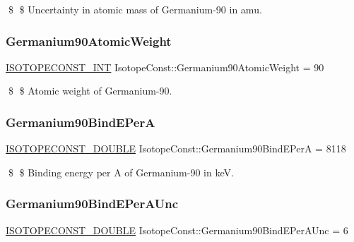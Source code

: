 \$ \$ Uncertainty in atomic mass of Germanium-\/90 in amu. \mbox{\label{group___isotope_const-_germanium-_ge90_ga7f4f88f50578589ab4432419ccce3417}} 
\subsubsection{\texorpdfstring{Germanium90\+Atomic\+Weight}{Germanium90AtomicWeight}}
{\footnotesize\ttfamily \mbox{\hyperlink{group___isotope_const-_macros_ga5f18360b3e99483a35c32d789e62621c}{I\+S\+O\+T\+O\+P\+E\+C\+O\+N\+S\+T\+\_\+\+I\+NT}} Isotope\+Const\+::\+Germanium90\+Atomic\+Weight = 90}

\$ \$ Atomic weight of Germanium-\/90. \mbox{\label{group___isotope_const-_germanium-_ge90_gac9ab75f606b60c91de4aa324fabcc825}} 
\subsubsection{\texorpdfstring{Germanium90\+Bind\+E\+PerA}{Germanium90BindEPerA}}
{\footnotesize\ttfamily \mbox{\hyperlink{group___isotope_const-_macros_ga8f45a7272ce02c0b4c65c44636ed719a}{I\+S\+O\+T\+O\+P\+E\+C\+O\+N\+S\+T\+\_\+\+D\+O\+U\+B\+LE}} Isotope\+Const\+::\+Germanium90\+Bind\+E\+PerA = 8118}

\$ \$ Binding energy per A of Germanium-\/90 in keV. \mbox{\label{group___isotope_const-_germanium-_ge90_gaee2b58c808b729a075421f7578ff5fa9}} 
\subsubsection{\texorpdfstring{Germanium90\+Bind\+E\+Per\+A\+Unc}{Germanium90BindEPerAUnc}}
{\footnotesize\ttfamily \mbox{\hyperlink{group___isotope_const-_macros_ga8f45a7272ce02c0b4c65c44636ed719a}{I\+S\+O\+T\+O\+P\+E\+C\+O\+N\+S\+T\+\_\+\+D\+O\+U\+B\+LE}} Isotope\+Const\+::\+Germanium90\+Bind\+E\+Per\+A\+Unc = 6}


